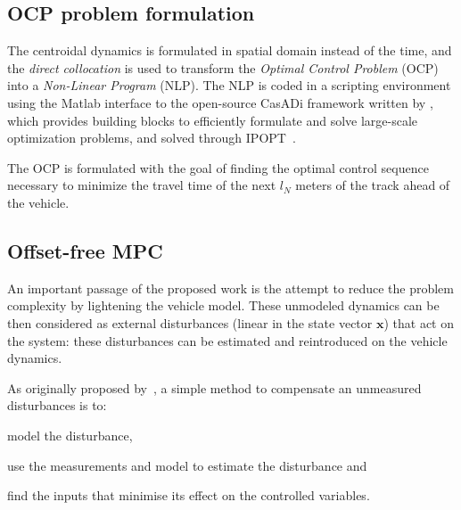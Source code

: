 \documentclass[conference]{IEEEtran} %
\renewcommand{\vec}[1]{\boldsymbol{#1}}
\begin{document}


\subsection{OCP problem formulation}

The centroidal dynamics is formulated in spatial domain instead of the time, and the \emph{direct collocation} is used to transform the \emph{Optimal Control Problem} (OCP) into a \emph{Non-Linear Program} (NLP). The NLP is coded in a scripting environment using the Matlab interface to the open-source CasADi framework written by \cite{Andersson2019}, which provides building
blocks to efficiently formulate and solve large-scale optimization problems, and solved through IPOPT~\cite{Wachter2006}.

The OCP is formulated with the goal of finding the optimal control sequence necessary to minimize the travel time of the next $l_N$ meters of the track ahead of the vehicle.

\subsection{Offset-free MPC}
\label{sec:offsetfree}

An important passage of the proposed work is the attempt to reduce the problem complexity by lightening the vehicle model.
These unmodeled dynamics can be then considered as external disturbances (linear in the state vector $\vec x$) that act on the system: these disturbances can be estimated and reintroduced on the vehicle dynamics.

As originally proposed by~\citet{Pannocchia2015}, a simple method to compensate an unmeasured disturbances is to:
\begin{enumerate*}[label=(\roman*)]
	\item model the disturbance,
	\item use the measurements and model to estimate the disturbance and
	\item find the inputs that minimise its effect on the controlled variables.
\end{enumerate*}
\end{document}
